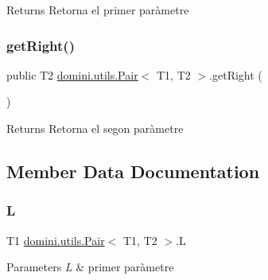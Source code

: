 \begin{DoxyReturn}{Returns}
Retorna el primer paràmetre 
\end{DoxyReturn}
\mbox{\label{classdomini_1_1utils_1_1Pair_a0dca94eb1a43952258bebe1dca4c84e9}} 
\subsubsection{\texorpdfstring{get\+Right()}{getRight()}}
{\footnotesize\ttfamily public T2 \hyperlink{classdomini_1_1utils_1_1Pair}{domini.\+utils.\+Pair}$<$ T1, T2 $>$.get\+Right (\begin{DoxyParamCaption}{ }\end{DoxyParamCaption})\hspace{0.3cm}{\ttfamily [inline]}}

\begin{DoxyReturn}{Returns}
Retorna el segon paràmetre 
\end{DoxyReturn}


\subsection{Member Data Documentation}
\mbox{\label{classdomini_1_1utils_1_1Pair_a276a0eee9fa97fc27b37fab887f07cea}} 
\subsubsection{\texorpdfstring{L}{L}}
{\footnotesize\ttfamily T1 \hyperlink{classdomini_1_1utils_1_1Pair}{domini.\+utils.\+Pair}$<$ T1, T2 $>$.L\hspace{0.3cm}{\ttfamily [package]}}


\begin{DoxyParams}{Parameters}
{\em L} & primer paràmetre \\
\hline
\end{DoxyParams}
\mbox{\label{classdomini_1_1utils_1_1Pair_aebf54d48000999b84e5e24a2c62088d4}} 
